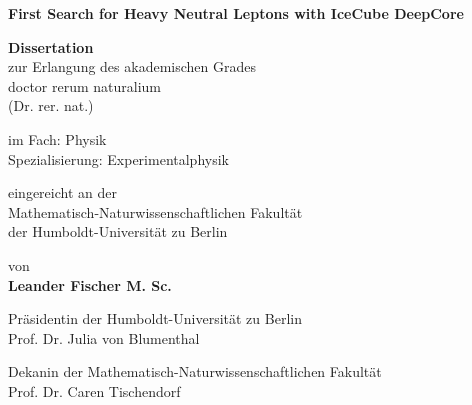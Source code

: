 \thispagestyle{plain}
\begin{center}
	\vspace*{1cm}

	\LARGE
	\textbf{First Search for Heavy Neutral Leptons with IceCube DeepCore}
	\large

	\vspace{0.8cm}

	\textbf{Dissertation} \\
	zur Erlangung des akademischen Grades \\
	doctor rerum naturalium \\
	(Dr. rer. nat.) \\

	\vspace{0.5cm}

	im Fach: Physik \\
	Spezialisierung: Experimentalphysik \\

	\vspace{0.5cm}

	eingereicht an der \\
	Mathematisch-Naturwissenschaftlichen Fakultät \\
	der Humboldt-Universität zu Berlin \\

	\vspace{0.5cm}

	von \\
	\textbf{Leander Fischer M. Sc.} \\

	\vspace{0.8cm}


	\vspace{0.5cm}

	Präsidentin der Humboldt-Universität zu Berlin \\
	Prof. Dr. Julia von Blumenthal \\

	\vspace{0.5cm}

	Dekanin der Mathematisch-Naturwissenschaftlichen Fakultät \\
	Prof. Dr. Caren Tischendorf \\

	\vspace{0.5cm}


\end{center}
